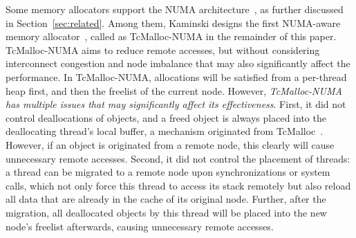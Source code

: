 Some memory allocators support the NUMA architecture~\cite{tcmallocnew, kim2013node, yang2019jarena, mimalloc}, as further discussed in Section~\ref{sec:related}. 
Among them, Kaminski designs the first NUMA-aware memory allocator~\cite{tcmallocnew}, called as TcMalloc-NUMA in the remainder of this paper. TcMalloc-NUMA aims to reduce remote accesses, but without considering interconnect congestion and node imbalance that may also significantly affect the performance. In TcMalloc-NUMA, allocations will be satisfied from a per-thread heap first, and then the freelist of the current node. However, \textit{TcMalloc-NUMA has multiple issues that may significantly affect its effectiveness}. First, it did not control deallocations of objects, and a freed object is always placed into the deallocating thread's local buffer, a mechanism originated from TcMalloc~\cite{tcmalloc}. However, if an object is originated from a remote node, this clearly will cause unnecessary remote accesses. Second, it did not control the placement of threads: a thread can be migrated to a remote node upon synchronizations or system calls, which not only force this thread to access its stack remotely but also reload all data that are already in the cache of its original node.  Further, after the migration, all deallocated objects by this thread will be placed into the new node's freelist afterwards, causing unnecessary remote accesses. %
 
 

